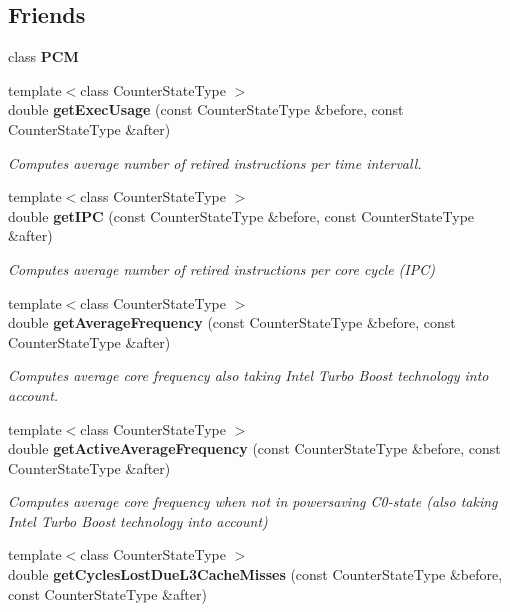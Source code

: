 \subsection*{Friends}
\begin{DoxyCompactItemize}
\item 
class {\bfseries P\+CM}\label{classBasicCounterState_ab5f56d2e95ba3daf52c17b8a1d356d64}

\item 
{\footnotesize template$<$class Counter\+State\+Type $>$ }\\double {\bf get\+Exec\+Usage} (const Counter\+State\+Type \&before, const Counter\+State\+Type \&after)
\begin{DoxyCompactList}\small\item\em Computes average number of retired instructions per time intervall. \end{DoxyCompactList}\item 
{\footnotesize template$<$class Counter\+State\+Type $>$ }\\double {\bf get\+I\+PC} (const Counter\+State\+Type \&before, const Counter\+State\+Type \&after)
\begin{DoxyCompactList}\small\item\em Computes average number of retired instructions per core cycle (I\+PC) \end{DoxyCompactList}\item 
{\footnotesize template$<$class Counter\+State\+Type $>$ }\\double {\bf get\+Average\+Frequency} (const Counter\+State\+Type \&before, const Counter\+State\+Type \&after)
\begin{DoxyCompactList}\small\item\em Computes average core frequency also taking Intel Turbo Boost technology into account. \end{DoxyCompactList}\item 
{\footnotesize template$<$class Counter\+State\+Type $>$ }\\double {\bf get\+Active\+Average\+Frequency} (const Counter\+State\+Type \&before, const Counter\+State\+Type \&after)
\begin{DoxyCompactList}\small\item\em Computes average core frequency when not in powersaving C0-\/state (also taking Intel Turbo Boost technology into account) \end{DoxyCompactList}\item 
{\footnotesize template$<$class Counter\+State\+Type $>$ }\\double {\bf get\+Cycles\+Lost\+Due\+L3\+Cache\+Misses} (const Counter\+State\+Type \&before, const Counter\+State\+Type \&after)

\end{DoxyCompactItemize}
